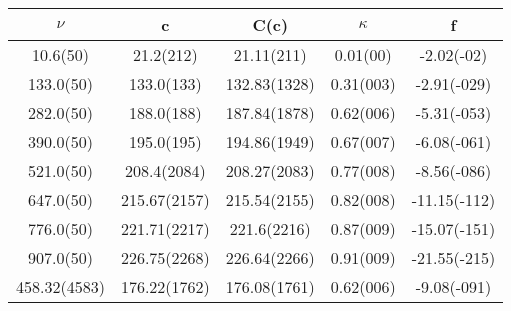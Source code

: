 \begin{table}[H]
	\centering
	\begin{tabular}{ccccc}
		$\nu$ & c & C(c) & $\kappa$ & f\\
		\hline
		10.6(50) & 21.2(212) & 21.11(211) & 0.01(00) & -2.02(-02)	\\
		133.0(50) & 133.0(133) & 132.83(1328) & 0.31(003) & -2.91(-029)	\\
		282.0(50) & 188.0(188) & 187.84(1878) & 0.62(006) & -5.31(-053)	\\
		390.0(50) & 195.0(195) & 194.86(1949) & 0.67(007) & -6.08(-061)	\\
		521.0(50) & 208.4(2084) & 208.27(2083) & 0.77(008) & -8.56(-086)	\\
		647.0(50) & 215.67(2157) & 215.54(2155) & 0.82(008) & -11.15(-112)	\\
		776.0(50) & 221.71(2217) & 221.6(2216) & 0.87(009) & -15.07(-151)	\\
		907.0(50) & 226.75(2268) & 226.64(2266) & 0.91(009) & -21.55(-215)	\\
		458.32(4583) & 176.22(1762) & 176.08(1761) & 0.62(006) & -9.08(-091)	\\
	\end{tabular}
\end{table}